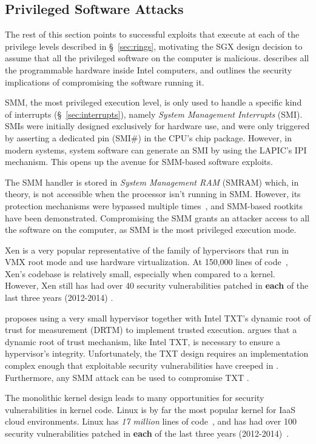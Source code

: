 \subsection{Privileged Software Attacks}
\label{sec:system_software_attacks}

The rest of this section points to successful exploits that execute at each of
the privilege levels described in \S~\ref{sec:rings}, motivating the SGX design
decision to assume that all the privileged software on the computer is
malicious. \cite{rutkowska2015intelsux} describes all the programmable hardware
inside Intel computers, and outlines the security implications of compromising
the software running it.

SMM, the most privileged execution level, is only used to handle a specific
kind of interrupts (\S~\ref{sec:interrupts}), namely
\textit{System Management Interrupts} (SMI). SMIs were initially designed
exclusively for hardware use, and were only triggered by asserting a dedicated
pin (SMI\#) in the CPU's chip package. However, in modern systems, system
software can generate an SMI by using the LAPIC's IPI mechanism. This opens up
the avenue for SMM-based software exploits.

The SMM handler is stored in  \textit{System Management RAM} (SMRAM) which, in
theory, is not accessible when the processor isn't running in SMM. However, its
protection mechanisms were bypassed multiple times~\cite{duflot2006smm,
rutkowska2008remap, wojtczuk2009smm, kallenberg2014smm}, and SMM-based
rootkits~\cite{wecherowski2009smm, embleton2010smm} have been demonstrated.
Compromising the SMM grants an attacker access to all the software on the
computer, as SMM is the most privileged execution mode.

Xen \cite{zhang2008xen} is a very popular representative of the family of
hypervisors that run in VMX root mode and use hardware virtualization. At
150,000 lines of code~\cite{xen2015loc}, Xen's codebase is relatively small,
especially when compared to a kernel. However, Xen still has had over 40
security vulnerabilities patched in \textbf{each} of the last three years
(2012-2014) \cite{cvedetails2014xen}.

\cite{mccune2010trustvisor} proposes using a very small hypervisor together
with Intel TXT's dynamic root of trust for measurement (DRTM) to implement
trusted execution. \cite{vasudevan2010requirements} argues that a dynamic root
of trust mechanism, like Intel TXT, is necessary to ensure a hypervisor's
integrity.  Unfortunately, the TXT design requires an implementation complex
enough that exploitable security vulnerabilities have creeped in
\cite{wojtczuk2009txt2, wojtczuk2011txt}. Furthermore, any SMM attack can be
used to compromise TXT \cite{wojtczuk2009txt}.

The monolithic kernel design leads to many opportunities for security
vulnerabilities in kernel code. Linux is by far the most popular kernel for
IaaS cloud environments. Linux has \emph{17 million} lines of
code~\cite{anthony2014linuxsize}, and  has had over 100 security
vulnerabilities patched in \textbf{each} of the last three years
(2012-2014)~\cite{cvedetails2014linux, chen2011linux}.
